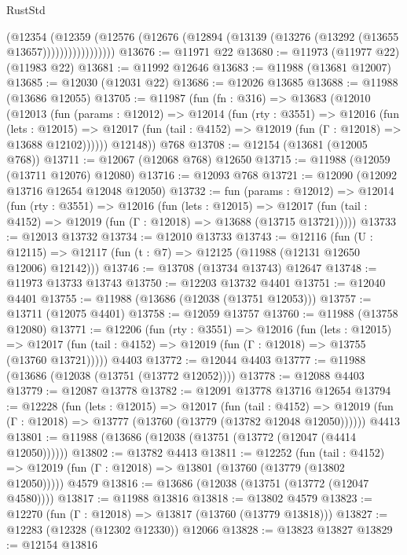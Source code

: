 \begin{lexlean}{RustStd}
\begin{coremodule}
                    (@12354
                      (@12359
                        (@12576
                          (@12676 (@12894 (@13139 (@13276 (@13292 (@13655 @13657)))))))))))))))))
@13676 := @11971 @22
@13680 := @11973 (@11977 @22) (@11983 @22)
@13681 := @11992 @12646
@13683 := @11988 (@13681 @12007)
@13685 := @12030 (@12031 @22)
@13686 := @12026 @13685
@13688 := @11988 (@13686 @12055)
@13705 := @11987
    (fun (fn : @316) =>
    @13683
      (@12010
        (@12013
          (fun (params : @12012) =>
          @12014
            (fun (rty : @3551) =>
            @12016
              (fun (lets : @12015) =>
              @12017 (fun (tail : @4152) => @12019 (fun (Γ : @12018) => @13688 @12102))))))
        @12148))
    @768
@13708 := @12154 (@13681 (@12005 @768))
@13711 := @12067 (@12068 @768) @12650
@13715 := @11988 (@12059 (@13711 @12076) @12080)
@13716 := @12093 @768
@13721 := @12090 (@12092 @13716 @12654 @12048 @12050)
@13732 := fun (params : @12012) =>
  @12014
    (fun (rty : @3551) =>
    @12016
      (fun (lets : @12015) =>
      @12017 (fun (tail : @4152) => @12019 (fun (Γ : @12018) => @13688 (@13715 @13721)))))
@13733 := @12013 @13732
@13734 := @12010 @13733
@13743 := @12116
    (fun (U : @12115) => @12117 (fun (t : @7) => @12125 (@11988 (@12131 @12650 @12006) @12142)))
@13746 := @13708 (@13734 @13743) @12647
@13748 := @11973 @13733 @13743
@13750 := @12203 @13732 @4401
@13751 := @12040 @4401
@13755 := @11988 (@13686 (@12038 (@13751 @12053)))
@13757 := @13711 (@12075 @4401)
@13758 := @12059 @13757
@13760 := @11988 (@13758 @12080)
@13771 := @12206
    (fun (rty : @3551) =>
    @12016
      (fun (lets : @12015) =>
      @12017 (fun (tail : @4152) => @12019 (fun (Γ : @12018) => @13755 (@13760 @13721)))))
    @4403
@13772 := @12044 @4403
@13777 := @11988 (@13686 (@12038 (@13751 (@13772 @12052))))
@13778 := @12088 @4403
@13779 := @12087 @13778
@13782 := @12091 @13778 @13716 @12654
@13794 := @12228
    (fun (lets : @12015) =>
    @12017
      (fun (tail : @4152) =>
      @12019 (fun (Γ : @12018) => @13777 (@13760 (@13779 (@13782 @12048 @12050))))))
    @4413
@13801 := @11988 (@13686 (@12038 (@13751 (@13772 (@12047 (@4414 @12050))))))
@13802 := @13782 @4413
@13811 := @12252
    (fun (tail : @4152) => @12019 (fun (Γ : @12018) => @13801 (@13760 (@13779 (@13802 @12050)))))
    @4579
@13816 := @13686 (@12038 (@13751 (@13772 (@12047 @4580))))
@13817 := @11988 @13816
@13818 := @13802 @4579
@13823 := @12270 (fun (Γ : @12018) => @13817 (@13760 (@13779 @13818)))
@13827 := @12283 (@12328 (@12302 @12330)) @12066
@13828 := @13823 @13827
@13829 := @12154 @13816

\end{coremodule}
\end{lexlean}

